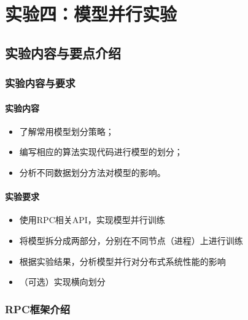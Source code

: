 \chapter{实验四：模型并行实验}

\section{实验内容与要点介绍}

\subsection{实验内容与要求}
\subsubsection{实验内容}
\begin{itemize}
    \item 了解常用模型划分策略；
    \item 编写相应的算法实现代码进行模型的划分；
    \item 分析不同数据划分方法对模型的影响。
\end{itemize}

\subsubsection{实验要求}
\begin{itemize}
    \item 使用RPC相关API，实现模型并行训练
    \item 将模型拆分成两部分，分别在不同节点（进程）上进行训练
    \item 根据实验结果，分析模型并行对分布式系统性能的影响
    \item （可选）实现横向划分
\end{itemize}

\subsection{RPC框架介绍}

